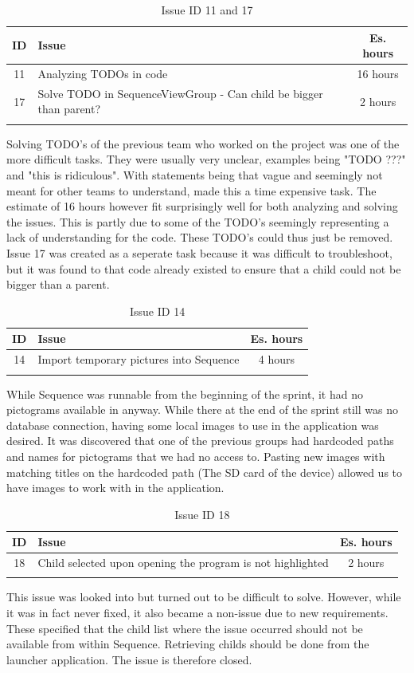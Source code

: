 \begin{longtable} { | c | p{12cm} | c | } 
\hline
	ID 	&	Issue	&		 Es. hours \\\hline
	11	& 	Analyzing TODOs in code	&	16 hours	\\\hline
	17	& 	Solve TODO in SequenceViewGroup - Can child be bigger than parent?	&	2 hours	\\\hline
\caption{Issue ID 11 and 17}
\label{tab:spr1_issues11_17}
\end{longtable}

Solving TODO's of the previous team who worked on the project was one of the more difficult tasks. They were usually very unclear, examples being "TODO ???" and "this is ridiculous". With statements being that vague and seemingly not meant for other teams to understand, made this a time expensive task. The estimate of 16 hours however fit surprisingly well for both analyzing and solving the issues. This is partly due to some of the TODO's seemingly representing a lack of understanding for the code. These TODO's could thus just be removed. Issue 17 was created as a seperate task because it was difficult to troubleshoot, but it was found to that code already existed to ensure that a child could not be bigger than a parent.

\begin{longtable} { | c | p{12cm} | c | } 
\hline
	ID 	&	Issue	&		 Es. hours \\\hline
	14	& 	Import temporary pictures into Sequence	&	4 hours	\\\hline
\caption{Issue ID 14}
\label{tab:spr1_issue14}
\end{longtable}
While Sequence was runnable from the beginning of the sprint, it had no pictograms available in anyway. While there at the end of the sprint still was no database connection, having some local images to use in the application was desired. It was discovered that one of the previous groups had hardcoded paths and names for pictograms that we had no access to. Pasting new images with matching titles on the hardcoded path (The SD card of the device) allowed us to have images to work with in the application.

\begin{longtable} { | c | p{12cm} | c | } 
\hline
	ID 	&	Issue	&		 Es. hours \\\hline
	18	& 	Child selected upon opening the program is not highlighted	&	2 hours	\\\hline
\caption{Issue ID 18}
\label{tab:spr1_issue18}
\end{longtable}
This issue was looked into but turned out to be difficult to solve. However, while it was in fact never fixed, it also became a non-issue due to new requirements. These specified that the child list where the issue occurred should not be available from within Sequence. Retrieving childs should be done from the launcher application. The issue is therefore closed.


